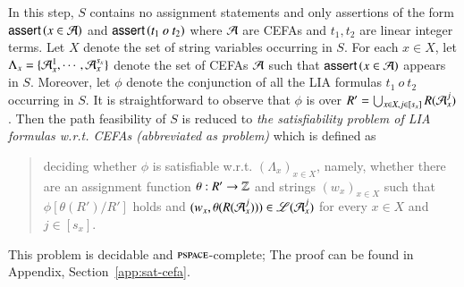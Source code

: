 In this step, $S$ %
contains no assignment statements and only assertions of the form $\textsf{assert}\left(x \in \mathcal{A}\right)$ and  $\textsf{assert}\left(t_1\ o\ t_2\right)$  where $\mathcal{A}$ are CEFAs and $t_1, t_2$ are linear integer terms. %
%
Let $X$ denote the set of string variables occurring in $S$.
For each $x \in X$, let $\Lambda_x=\{\mathcal{A}_{x}^1, \cdots, \mathcal{A}_{x}^{s_x}\}$ denote the set of CEFAs $\mathcal{A}$ such that $\textsf{assert}\left(x \in \mathcal{A}\right)$ appears in $S$. 
Moreover, let $\phi$ denote the conjunction of all the LIA formulas $t_1\ o\ t_2$ occurring in $S$. It is straightforward to observe that $\phi$ is over %
$R'=\bigcup_{x\in X, j \in [s_x]}R(\mathcal{A}_{x}^{j})$. Then the path feasibility of $S$ is reduced to \emph{the satisfiability problem of LIA formulas w.r.t. CEFAs (abbreviated as {\lasat} problem)} which is defined as 
\begin{quote}
deciding whether $\phi$ is satisfiable w.r.t. $(\Lambda_x)_{x \in X}$, namely,  %
%	
whether %
there are an assignment function $\theta: R' \rightarrow \mathbb{Z}$ and strings $(w_x)_{x \in X}$ such that  $\phi[\theta(R')/R']$ holds and $(w_x, \theta(R(\mathcal{A}_{x}^{j}))) \in \mathscr{L}(\mathcal{A}_{x}^{j})$ for every $x \in X$ and $j \in [s_x]$.
\end{quote}
This {\lasat} problem is decidable and $\textsc{pspace}$-complete;
The proof can be found in Appendix, Section~\ref{app:sat-cefa}.  

%	
% 

